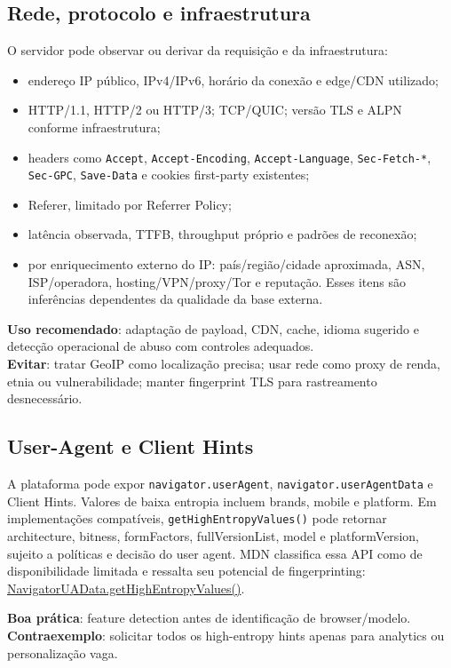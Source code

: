 \documentclass[11pt,a4paper]{article}
\begin{document}
\subsection{Rede, protocolo e infraestrutura}
O servidor pode observar ou derivar da requisição e da infraestrutura:
\begin{itemize}
\item endereço IP público, IPv4/IPv6, horário da conexão e edge/CDN utilizado;
\item HTTP/1.1, HTTP/2 ou HTTP/3; TCP/QUIC; versão TLS e ALPN conforme infraestrutura;
\item headers como \texttt{Accept}, \texttt{Accept-Encoding}, \texttt{Accept-Language}, \texttt{Sec-Fetch-*}, \texttt{Sec-GPC}, \texttt{Save-Data} e cookies first-party existentes;
\item Referer, limitado por Referrer Policy;
\item latência observada, TTFB, throughput próprio e padrões de reconexão;
\item por enriquecimento externo do IP: país/região/cidade aproximada, ASN, ISP/operadora, hosting/VPN/proxy/Tor e reputação. Esses itens são inferências dependentes da qualidade da base externa.
\end{itemize}
\textbf{Uso recomendado}: adaptação de payload, CDN, cache, idioma sugerido e detecção operacional de abuso com controles adequados.\\
\textbf{Evitar}: tratar GeoIP como localização precisa; usar rede como proxy de renda, etnia ou vulnerabilidade; manter fingerprint TLS para rastreamento desnecessário.

\subsection{User-Agent e Client Hints}
A plataforma pode expor \texttt{navigator.userAgent}, \texttt{navigator.userAgentData} e Client Hints. Valores de baixa entropia incluem brands, mobile e platform. Em implementações compatíveis, \texttt{getHighEntropyValues()} pode retornar architecture, bitness, formFactors, fullVersionList, model e platformVersion, sujeito a políticas e decisão do user agent. MDN classifica essa API como de disponibilidade limitada e ressalta seu potencial de fingerprinting: \href{https://developer.mozilla.org/en-US/docs/Web/API/NavigatorUAData/getHighEntropyValues}{NavigatorUAData.getHighEntropyValues()}.

\textbf{Boa prática}: feature detection antes de identificação de browser/modelo.\\
\textbf{Contraexemplo}: solicitar todos os high-entropy hints apenas para analytics ou personalização vaga.
\end{document}
